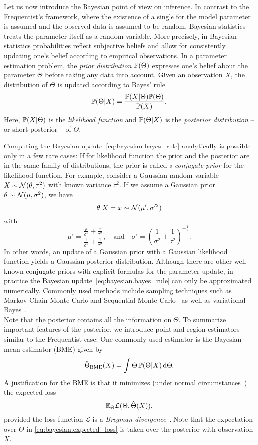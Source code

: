 Let us now introduce the Bayesian point of view on inference.
In contrast to the Frequentist's framework, where the existence of a single  for the model parameter is assumed and the observed data is assumed to be random, Bayesian statistics treats the parameter itself as a random variable.
More precisely, in Bayesian statistics probabilities reflect subjective beliefs and allow for consistently updating one's belief according to empirical observations.
In a parameter estimation problem, the \emph{prior distribution} $\mathbb{P}(\Theta)$ expresses one's belief about the parameter $\Theta$ before taking any data into account.
Given an observation $X$, the distribution of $\Theta$ is updated according to Bayes' rule~\cite{}
\[
  \label{eq:bayesian.bayes_rule}
  \mathbb{P}(\Theta | X) = \frac{\mathbb{P}(X | \Theta) \mathbb{P}(\Theta)}{\mathbb{P}(X)}.
\]
Here, $\mathbb{P}(X|\Theta)$ is the \emph{likelihood function} and $\mathbb{P}(\Theta | X)$ is the \emph{posterior distribution} -- or short posterior -- of $\Theta$.

Computing the Bayesian update~\eqref{eq:bayesian.bayes_rule} analytically is possible only in a few rare cases:
If for likelihood function the prior and the posterior are in the same family of distributions, the prior is called a \emph{conjugate prior} for the likelihood function.
For example, consider a Gaussian random variable $X \sim \mathcal{N}(\theta, \tau^2)$ with known variance $\tau^2$.
If we assume a Gaussian prior $\theta \sim \mathcal{N}(\mu, \sigma^2)$, we have~\cite{}
\[
  \theta \vert X=x \sim \mathcal{N} (\mu', \sigma'^2)
\]
with
\[
  \mu' = \frac{ \frac{\mu}{\sigma^2} + \frac{x}{\tau^2} }{ \frac{1}{\sigma^2} + \frac{1}{\tau^2} },
  \quad\mbox{and}\quad
  \sigma' = \left( \frac{1}{\sigma^2} + \frac{1}{\tau^2} \right)^{- \tfrac{1}{2}}.
\]
In other words, an update of a Gaussian prior with a Gaussian likelihood function yields a Gaussian posterior distribution.
Although there are other well-known conjugate priors with explicit formulas for the parameter update, in practice the Bayesian update~\eqref{eq:bayesian.bayes_rule} can only be approximated numerically.
Commonly used methods include sampling techniques such as Markov Chain Monte Carlo and Sequential Monte Carlo~\cite{} as well as variational Bayes~\cite{}.\\


Note that the posterior contains all the information on $\Theta$.
To summarize important features of the posterior, we introduce point and region estimators similar to the Frequentist case:
One commonly used estimator is the Bayesian mean estimator (BME) given by
\[
  \hat\Theta_\mathrm{BME}(X) = \int \Theta \, \mathbb{P}(\Theta | X) \, \mathrm{d}\Theta.
\]
A justification for the BME is that it minimizes (under normal circumstances~\cite{Lehmann_1998_Theory}) the expected loss
\[
  \label{eq:bayesian.expected_loss}
  \mathbb{E}_\Theta \mathcal{L}(\Theta, \hat\Theta(X)),
\]
provided the loss function $\mathcal{L}$ is a \emph{Bregman divergence}~\cite{Banerjee_2005_On}.
Note that the expectation over $\Theta$ in \cref{eq:bayesian.expected_loss} is taken over the posterior with observation $X$.


